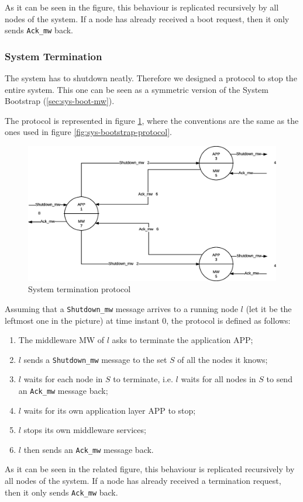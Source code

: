 As it can be seen in the figure, this behaviour is replicated recursively
by all nodes of the system. If a node has already received a boot request,
then it only sends \texttt{Ack\_mw} back.


\subsubsection{System Termination}
The system has to shutdown neatly. Therefore we designed a protocol to
stop the entire system. This one can be seen as a
symmetric version of the System Bootstrap (\ref{sec:sys-boot-mw}).

The protocol is represented in figure \ref{fig:sys-termination-protocol}, where
the conventions are the same as the ones used in figure
\ref{fig:sys-bootstrap-protocol}.

\begin{figure}[H]
  \centering
  \includegraphics[width=\columnwidth]{images/solution/termination.eps}
  \caption{System termination protocol}
  \label{fig:sys-termination-protocol}
\end{figure}

Assuming that a \texttt{Shutdown\_mw} message arrives to a running node
$l$ (let it be the leftmost one in the picture) at time instant $0$, the
protocol is defined as follows:

\begin{enumerate}
\item The middleware MW of $l$ asks to terminate the application APP;
\item $l$ sends a \texttt{Shutdown\_mw} message to the set
  $S$ of all the nodes it knows;
\item $l$ waits for each node in $S$ to terminate, i.e. $l$ waits for all
  nodes in $S$ to send an \texttt{Ack\_mw} message back;
\item $l$ waits for its own application layer APP to stop;
\item $l$ stops its own middleware services;
\item $l$ then sends an \texttt{Ack\_mw} message back.
\end{enumerate}

As it can be seen in the related figure, this behaviour is replicated
recursively by all nodes of the system. If a node has already received a
termination request, then it only sends \texttt{Ack\_mw} back.
